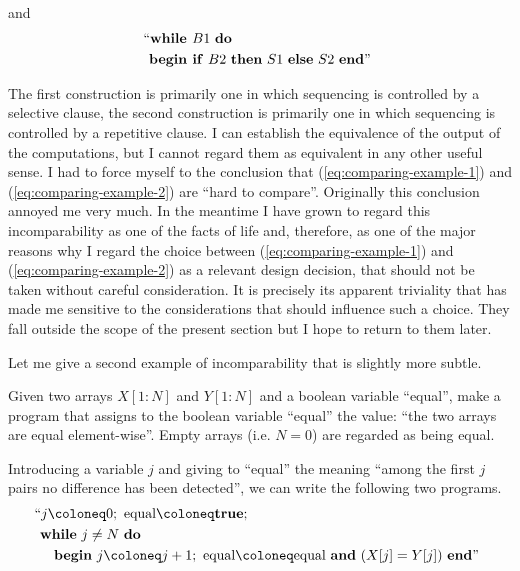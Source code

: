\documentclass[twoside,11pt]{book}
\begin{document}
\noindent
and
\begin{equation}
	\label{eq:comparing-example-2}
	\begin{split}
		&\text{\hspace{-.4em}``\textbf{while }} B1\text{ \textbf{do}}\\
		&\text{\textbf{begin if} } B2\text{ \textbf{then} } S1\text{ \textbf{else} } S2\text{ \textbf{end}''}
	\end{split}
\end{equation}

\label{pg:dilema}
The first construction is primarily one in which sequencing is controlled by a selective clause, the second construction is primarily one in which sequencing is controlled by a repetitive clause. I can establish the equivalence of the output of the computations, but I cannot regard them as equivalent in any other useful sense. I had to force myself to the conclusion that (\ref{eq:comparing-example-1}) and (\ref{eq:comparing-example-2}) are ``hard to compare''. Originally this conclusion annoyed me very much. In the meantime I have grown to regard this incomparability as one of the facts of life and, therefore, as one of the major reasons why I regard the choice between (\ref{eq:comparing-example-1}) and (\ref{eq:comparing-example-2}) as a relevant design decision, that should not be taken without careful consideration. It is precisely its apparent triviality that has made me sensitive to the considerations that should influence such a choice. They fall outside the scope of the present section but I hope to return to them later.

Let me give a second example of incomparability that is slightly more subtle.

Given two arrays $X[1:N]$ and $Y[1:N]$ and a boolean variable ``equal'', make a program that assigns to the boolean variable ``equal'' the value: ``the two arrays are equal element-wise''. Empty arrays (i.e. $N = 0$) are regarded as being equal.

Introducing a variable $j$ and giving to ``equal'' the meaning ``among the first $j$ pairs no difference has been detected'', we can write the following two programs.
\begin{equation}
	\label{eq:comparing-example-3}
	\begin{split}
		&\text{\hspace{-.4em}``}j \coloneq 0;\text{ equal} \coloneq \text{\textbf{true}};\\
		&\text{\textbf{while} } j \neq N\text{ \textbf{do}}\\
		&\quad\text{\textbf{begin} } j \coloneq  j + 1;\text{ equal} \coloneq \text{equal \textbf{and} } (X[j] = Y[j]) \text{ \textbf{end}''}
	\end{split}
\end{equation}
\end{document}
